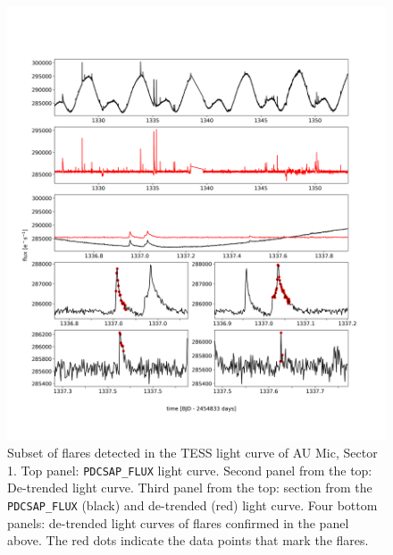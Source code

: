 \documentclass[fleqn,usenatbib,letters]{mnras}%
\begin{document}


\begin{figure}
\includegraphics[width=\hsize]{figures/aumic_illustrate_flares.png} 
\caption{Subset of flares detected in the TESS light curve of AU Mic, Sector 1. Top panel: \texttt{PDCSAP\_FLUX} light curve. Second panel from the top: De-trended light curve. Third panel from the top: section from the \texttt{PDCSAP\_FLUX} (black) and de-trended (red) light curve. Four bottom panels: de-trended light curves of flares confirmed in the panel above. The red dots indicate the data points that mark the flares.}
\label{fig:illustrate_detrend}
\end{figure}
\end{document}
